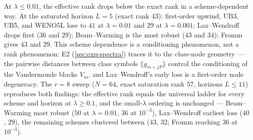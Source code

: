 \documentclass[pdflatex,sn-mathphys-num]{sn-jnl}%
\theoremstyle{thmstyleone}%
\theoremstyle{thmstyletwo}%
\theoremstyle{thmstylethree}%
\begin{document}
At $\lambda\le0.01$, the effective rank drops below the exact rank in a scheme-dependent way.
At the saturated horizon $L=5$ (exact rank $43$): first-order upwind, UB3, UB5, and WENO5L lose to $41$ at $\lambda=0.01$ and $29$ at $\lambda=0.001$; Lax--Wendroff drops first ($36$ and $29$); Beam--Warming is the most robust ($43$ and $34$); Fromm gives $43$ and $29$.
This scheme dependence is a conditioning phenomenon, not a rank phenomenon: E2 (\cref{sec:exp-spectra}) traces it to the class-node geometry --- the pairwise distances between class symbols $\{g_{m+jP}\}$ control the conditioning of the Vandermonde blocks $V_m$, and Lax--Wendroff's early loss is a first-order node degeneracy.
The $r=8$ sweep ($N=64$, exact saturation rank $57$, horizons $L\le11$) reproduces both findings: the effective rank equals the universal ladder for every scheme and horizon at $\lambda\ge0.1$, and the small-$\lambda$ ordering is unchanged --- Beam--Warming most robust ($50$ at $\lambda=0.01$, $36$ at $10^{-3}$), Lax--Wendroff earliest loss ($40$, $29$), the remaining schemes clustered between ($43$, $32$; Fromm reaching $36$ at $10^{-3}$).
\end{document}
